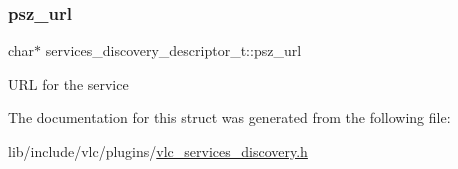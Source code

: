\subsubsection{\texorpdfstring{psz\+\_\+url}{psz\_url}}
{\footnotesize\ttfamily char$\ast$ services\+\_\+discovery\+\_\+descriptor\+\_\+t\+::psz\+\_\+url}

U\+RL for the service 

The documentation for this struct was generated from the following file\+:\begin{DoxyCompactItemize}
\item 
lib/include/vlc/plugins/\hyperlink{vlc__services__discovery_8h}{vlc\+\_\+services\+\_\+discovery.\+h}\end{DoxyCompactItemize}
